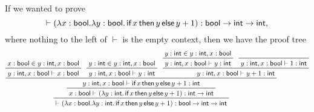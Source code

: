 \documentclass[class=scrartcl]{standalone}
\begin{document}
\begin{example}
  If we wanted to prove
  \[
    \vdash (\lambda x: \textsf{bool}. \lambda y:\textsf{bool}. \operatorname{\textsf{if}}x\operatorname{\textsf{then}}y\operatorname{\textsf{else}}y+1)
             : \textsf{bool} \to \textsf{int} \to \textsf{int},
  \]
  where nothing to the left of \(\vdash\) is the empty context,
  then we have the proof tree
  \[
    \prftree
    {\prftree
     {\prftree{\prftree{x : \pbool \in y: \pint, x : \pbool}
                       {y: \pint, x : \pbool \vdash x : \pbool}}
              {\prftree{y : \pint \in y: \pint, x : \pbool}
                       {y: \pint, x : \pbool \vdash y : \pint}}
              {\prftree{\prftree{y : \pint \in y: \pint, x : \pbool}
                                {y: \pint, x : \pbool \vdash y : \pint}}
                       {\prfaxiom{y: \pint, x : \pbool \vdash 1 : \pint}}
                       {y: \pint, x : \pbool \vdash y+1 : \pint}}
              {y: \pint, x : \pbool \vdash \pifthenelse{x}{y}{y+1} : \pint}}
     {x : \pbool \vdash
       (\lambda y: \pint.
          \pifthenelse{x}{y}{y+1})
       : \pint \to \pint}}
    {\vdash (\lambda x: \pbool.
               \lambda y: \pint.
                 \pifthenelse{x}{y}{y+1})
            : \pbool \to \pint \to \pint}
  \]
\end{example}
\end{document}
